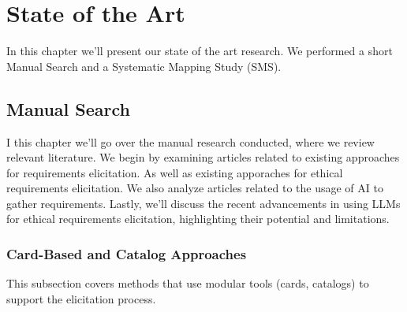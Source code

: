 
%

\chapter{State of the Art}
\label{cha:state_of_the_art}


\epigraphfontsize{\small\itshape}
\setlength\epigraphwidth{12.5cm}
\setlength\epigraphrule{0pt}


In this chapter we'll present our state of the art research. We performed a short Manual Search and a Systematic Mapping Study (SMS).



\section{Manual Search}
I this chapter we'll go over the manual research conducted, where we review relevant literature. We begin by examining articles related to existing approaches for requirements elicitation.
As well as existing apporaches for ethical requirements elicitation. We also analyze articles related to the usage of AI to gather requirements. Lastly, we'll discuss the recent advancements in
using LLMs for ethical requirements elicitation, highlighting their potential and limitations. 
  

\subsection{Card-Based and Catalog Approaches}
This subsection covers methods that use modular tools (cards, catalogs) to support the elicitation process.

